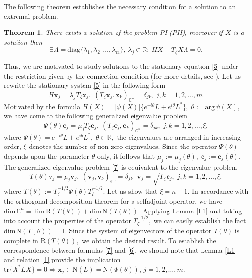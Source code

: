 \documentclass[a4paper,twoside,12pt]{article}
\newtheorem{theorem}{Theorem}
\begin{document}
    The following theorem \cite{KABaChu26}  establishes the necessary condition  for  a solution to an extremal problem.
\begin{theorem}\label{T1} There exists a solution of the problem  PI (PII), moreover if $X$ is a solution   then
 \begin{equation}\label{5}
\exists\Lambda=\mathrm{diag}\{\lambda_{1},\lambda_{2},\dots,\lambda_{m}\},\,\lambda_{j}\in \mathbb{R}:\;     H X- T_{\zeta}X\Lambda=0.
\end{equation}
\end{theorem}
  Thus, we are motivated   to study   solutions to the stationary equation  \eqref{5} under the  restriction given by the connection condition (for more details, see \cite{KABaChu26}). Let us  rewrite the stationary system \eqref{5} in the following form
 \begin{equation}\label{6}
 H\mathbf{x} _{ j } = \lambda_{j}T_{\zeta}\mathbf{x} _{ j },\;(T_{\zeta}\mathbf{x} _{ j },\mathbf{x} _{ k })_{\mathbb{C}^{n}}=\delta_{jk},\;j,k=1,2,\dots,m.
 \end{equation}
 Motivated by the formula $H(X)= |\psi(X)|\{ e^{-i\theta}L+e^{i\theta}L^{\ast}\},\;\theta:= \mathrm{arg}\, \psi(X),$ we have come to the following generalized eigenvalue problem
\begin{equation}\label{7}
\Psi(\theta)\mathbf{e}_{ j } =\mu_{j} T_{\zeta}\mathbf{e}_{ j },\;(T_{\zeta}\mathbf{e} _{ j },\mathbf{e} _{ k })_{\mathbb{C}^{n}}=\delta_{jk},\;j,k=1,2,\dots,\xi,
\end{equation}
where $\Psi(\theta)=e^{-i\theta}L+e^{i\theta}L^{\ast},\;\theta\in \mathbb{R},$    the eigenvalues are arranged in increasing order, $\xi$ denotes the number of non-zero eigenvalues.   Since the operator $\Psi(\theta)$ depends upon the parameter $\theta$ only, it follows that    $\mu_{j}:=\mu_{j}(\theta),\; \mathbf{e}_{ j }:=\mathbf{e}_{ j }(\theta).$   The generalized  eigenvalue problem  \eqref{7}  is equivalent to the eigenvalue problem
\begin{equation}\label{8}
T(\theta)\mathbf{v}_{j} =\mu_{j}\mathbf{v}_{j},\;(\mathbf{v}_{j},\mathbf{v}_{k})_{\mathbb{C}^{n}}=\delta_{jk},\,\mathbf{v}_{j}=\sqrt{T_{\zeta}}\mathbf{e}_{j},\;j,k=1,2,\dots,\xi,
\end{equation}
where $T(\theta):=T^{-1/2}_{\zeta}\Psi(\theta)T^{-1/2}_{\zeta}.$ Let us show that $\xi=n-1.$  In accordance with the orthogonal decomposition theorem for a selfadjoint operator, we have $\mathrm{dim} \,\mathbb{C}^{n}=\mathrm{dim}\, \mathrm{R}(T(\theta))+\mathrm{dim}\, \mathrm{N}(T(\theta)).$
 Applying Lemma \ref{L1} and taking into account the properties of the operator $T^{-1/2}_{\zeta},$  we can easily establish  the fact   $\mathrm{dim}\, \mathrm{N}(T(\theta))=1.$ Since the system of  eigenvectors of the operator $T(\theta)$ is complete in $\mathrm{R}(T(\theta)),$ we obtain the desired result. To establish the correspondence between formulas \eqref{7} and \eqref{6}, we should note that     Lemma \ref{L1} and  relation \eqref{1}   provide  the implication $\mathrm{tr}\{X^{\ast}LX\}=0 \Rightarrow \mathbf{x}_{j}\in \mathrm{N}(L)= \mathrm{N}(\Psi(\theta)),\,j=1,2,\ldots,m.$
\end{document}
